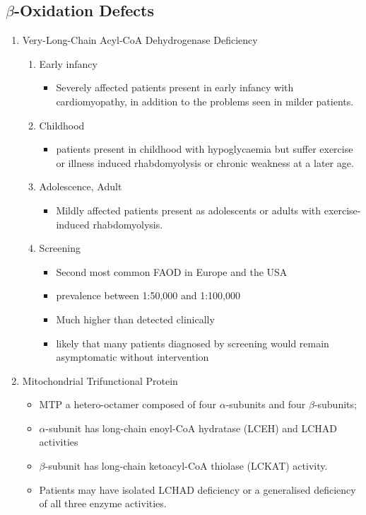 \documentclass{scrartcl}
\begin{document}
\subsection{\(\beta\)-Oxidation Defects}
\label{sec:org4ceb857}
\begin{enumerate}
\item Very-Long-Chain Acyl-CoA Dehydrogenase Deficiency
\label{sec:orgf7ce40e}
\begin{enumerate}
\item Early infancy
\label{sec:orge5b7360}
\begin{itemize}
\item Severely affected patients present in early infancy with
cardiomyopathy, in addition to the problems seen in milder patients.
\end{itemize}

\item Childhood
\label{sec:orga5809d5}
\begin{itemize}
\item patients present in childhood with hypoglycaemia but suffer exercise
or illness induced rhabdomyolysis or chronic weakness at a later age.
\end{itemize}

\item Adolescence, Adult
\label{sec:orgf4ffd1a}
\begin{itemize}
\item Mildly affected patients present as adolescents or adults with
exercise-induced rhabdomyolysis.
\end{itemize}

\item Screening
\label{sec:orgc4beb0c}
\begin{itemize}
\item Second most common FAOD in Europe and the USA
\item prevalence between 1:50,000 and 1:100,000
\item Much higher than detected clinically
\item likely that many patients diagnosed by screening would remain
asymptomatic without intervention
\end{itemize}
\end{enumerate}

\item Mitochondrial Trifunctional Protein
\label{sec:orga47e1d5}
\begin{itemize}
\item MTP a hetero-octamer composed of four \(\alpha\)-subunits and four \(\beta\)-subunits;
\item \(\alpha\)-subunit has long-chain enoyl-CoA hydratase (LCEH) and LCHAD activities
\item \(\beta\)-subunit has long-chain ketoacyl-CoA thiolase (LCKAT) activity.
\item Patients may have isolated LCHAD deficiency or a generalised deficiency of all three enzyme activities.


\end{itemize}
\end{enumerate}
\end{document}
